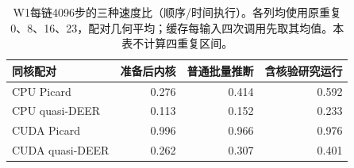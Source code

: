 \begin{table}[htbp]\centering\small
\begin{tabular}{lrrr}\toprule
同核配对 & 准备后内核 & 普通批量推断 & 含核验研究运行\\\midrule
CPU Picard & 0.276 & 0.414 & 0.592\\
CPU quasi-DEER & 0.113 & 0.152 & 0.233\\
CUDA Picard & 0.996 & 0.966 & 0.976\\
CUDA quasi-DEER & 0.262 & 0.307 & 0.401\\
\bottomrule\end{tabular}
\caption{W1每链4096步的三种速度比（顺序/时间执行）。各列均使用原重复0、8、16、23，配对几何平均；缓存每输入四次调用先取其均值。本表不计算四重复区间。}\label{tab:three-costs}
\end{table}
